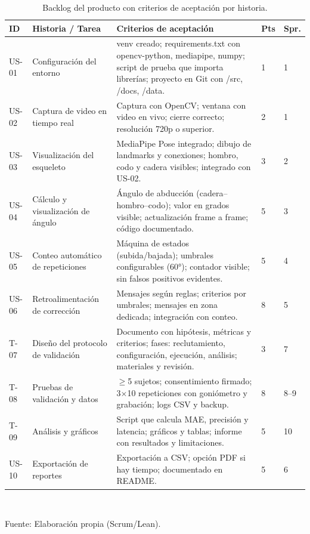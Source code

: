 \documentclass[11pt,a4paper]{article}
\renewcommand{\arraystretch}{1.35}
\begin{document}
\begin{table}[htbp]
\caption{Backlog del producto con criterios de aceptación por historia.}
\label{tab:backlog}
\small
\centering
\renewcommand{\arraystretch}{1.45}
\begin{tabular}{@{}p{0.75cm}p{2.7cm}p{5.8cm}p{0.5cm}p{0.6cm}@{}}
\toprule
ID & Historia / Tarea & Criterios de aceptación & Pts & Spr. \\
\midrule
US-01 & Configuración del entorno & venv creado; requirements.txt con opencv-python, mediapipe, numpy; script de prueba que importa librerías; proyecto en Git con /src, /docs, /data. & 1 & 1 \\
\addlinespace
US-02 & Captura de video en tiempo real & Captura con OpenCV; ventana con video en vivo; cierre correcto; resolución 720p o superior. & 2 & 1 \\
\addlinespace
US-03 & Visualización del esqueleto & MediaPipe Pose integrado; dibujo de landmarks y conexiones; hombro, codo y cadera visibles; integrado con US-02. & 3 & 2 \\
\addlinespace
US-04 & Cálculo y visualización de ángulo & Ángulo de abducción (cadera--hombro--codo); valor en grados visible; actualización frame a frame; código documentado. & 5 & 3 \\
\addlinespace
US-05 & Conteo automático de repeticiones & Máquina de estados (subida/bajada); umbrales configurables (60°); contador visible; sin falsos positivos evidentes. & 5 & 4 \\
\addlinespace
US-06 & Retroalimentación de corrección & Mensajes según reglas; criterios por umbrales; mensajes en zona dedicada; integración con conteo. & 8 & 5 \\
\addlinespace
T-07 & Diseño del protocolo de validación & Documento con hipótesis, métricas y criterios; fases: reclutamiento, configuración, ejecución, análisis; materiales y revisión. & 3 & 7 \\
\addlinespace
T-08 & Pruebas de validación y datos & $\geq$5 sujetos; consentimiento firmado; 3$\times$10 repeticiones con goniómetro y grabación; logs CSV y backup. & 8 & 8--9 \\
\addlinespace
T-09 & Análisis y gráficos & Script que calcula MAE, precisión y latencia; gráficos y tablas; informe con resultados y limitaciones. & 5 & 10 \\
\addlinespace
US-10 & Exportación de reportes & Exportación a CSV; opción PDF si hay tiempo; documentado en README. & 5 & 6 \\
\bottomrule
\end{tabular}\\
\renewcommand{\arraystretch}{1.35}
\vspace{4pt}
\raggedright\footnotesize Fuente: Elaboración propia (Scrum/Lean).
\end{table}
\vspace{0.6em}
\end{document}
